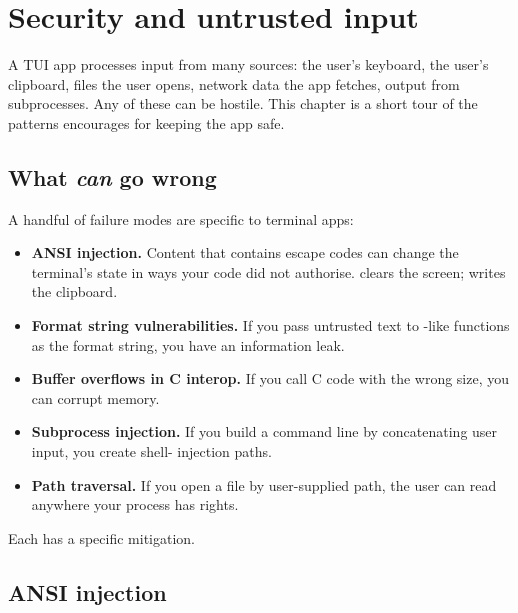 \chapter{Security and untrusted input}
\label{ch:security}

\begin{aside}
A TUI app processes input from many sources: the user's
keyboard, the user's clipboard, files the user opens, network
data the app fetches, output from subprocesses. Any of these
can be hostile. This chapter is a short tour of the patterns
\maya{} encourages for keeping the app safe.
\end{aside}

\section{What \emph{can} go wrong}

A handful of failure modes are specific to terminal apps:

\begin{itemize}[leftmargin=*]
  \item \textbf{ANSI injection.} Content that contains escape
    codes can change the terminal's state in ways your code
    did not authorise. \code{\\e[2J} clears the screen;
    \code{\\e]52;c;\ldots\\e\\textbackslash} writes the
    clipboard.
  \item \textbf{Format string vulnerabilities.} If you pass
    untrusted text to -like functions as the
    format string, you have an information leak.
  \item \textbf{Buffer overflows in C interop.} If you call C
    code with the wrong size, you can corrupt memory.
  \item \textbf{Subprocess injection.} If you build a command
    line by concatenating user input, you create shell-
    injection paths.
  \item \textbf{Path traversal.} If you open a file by
    user-supplied path, the user can read anywhere your
    process has rights.
\end{itemize}

Each has a specific mitigation.

\section{ANSI injection}

